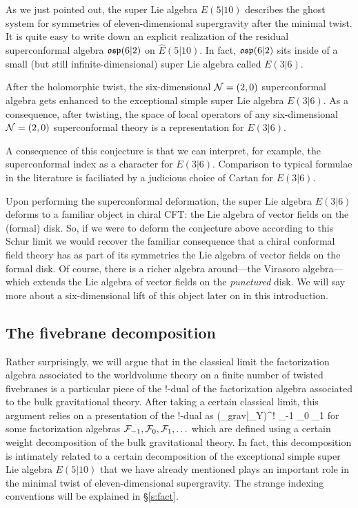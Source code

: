 As we just pointed out, the super Lie algebra $\widehat E(5|10)$ describes the ghost system for symmetries of eleven-dimensional supergravity after the minimal twist.
It is quite easy to write down an explicit realization of the residual superconformal algebra $\mathfrak{osp}(6|2)$ on $\widehat E(5|10)$.
In fact, $\mathfrak{osp}(6|2)$ sits inside of a small (but still infinite-dimensional) super Lie algebra called $E(3|6)$. 

\begin{conj}
After the holomorphic twist, the six-dimensional $\mathcal N = (2,0) $ superconformal algebra gets enhanced to the exceptional simple super Lie algebra $E(3|6)$.
As a consequence, after twisting, the space of local operators of any six-dimensional $\mathcal N=(2,0)$ superconformal theory is a representation for $E(3|6)$.
\end{conj}

A consequence of this conjecture is that we can interpret, for example, the superconformal index as a character for $E(3|6)$. Comparison to typical formulae in the literature is faciliated by a judicious choice of Cartan for $E(3|6)$.

Upon performing the superconformal deformation, the super Lie algebra $E(3|6)$ deforms to a familiar object in chiral CFT: the Lie algebra of vector fields on the (formal) disk.
So, if we were to deform the conjecture above according to this Schur limit we would recover the familiar consequence that a chiral conformal field theory has as part of its symmetries the Lie algebra of vector fields on the formal disk.
Of course, there is a richer algebra around---the Virasoro algebra---which extends the Lie algebra of vector fields on the {\em punctured} disk. 
We will say more about a six-dimensional lift of this object later on in this introduction.

\subsection{The fivebrane decomposition}
Rather surprisingly, we will argue that in the classical limit the factorization algebra associated to the worldvolume theory on a finite number of twisted fivebranes is a particular piece of the $!$-dual of the factorization algebra associated to the bulk gravitational theory. 
After taking a certain classical limit, this argument relies on a presentation of the $!$-dual as
\beqn
(\Obs_{grav}|_{Y})^{!} \simeq \cF_{-1} \otimes \cF_0 \otimes \cF_1 \otimes \cdots 
\eeqn
for some factorization algebras $\mathcal F_{-1},\mathcal F_0, \mathcal F_{1},\ldots$ which are defined using a certain weight decomposition of the bulk gravitational theory.
In fact, this decomposition is intimately related to a certain decomposition of the exceptional simple super Lie algebra $E(5|10)$ that we have already mentioned plays an important role in the minimal twist of eleven-dimensional supergravity.
The strange indexing conventions will be explained in \S\ref{s:fact}. 

